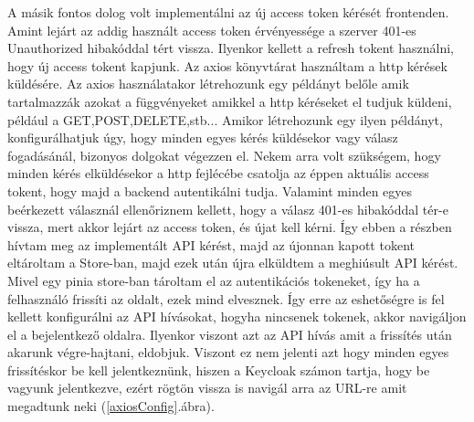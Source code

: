 \documentclass[a4paper,twoside]{article}
\begin{document}
A másik fontos dolog volt implementálni az új access token kérését frontenden. Amint lejárt az addig használt access token érvényessége a szerver 401-es Unauthorized 
hibakóddal tért vissza. Ilyenkor kellett a refresh tokent használni, hogy új access tokent kapjunk. Az axios könyvtárat használtam a http kérések küldésére. Az axios 
használatakor létrehozunk egy példányt belőle amik tartalmazzák azokat a függvényeket amikkel a http kéréseket el tudjuk küldeni, például a GET,POST,DELETE,stb... Amikor létrehozunk egy ilyen példányt, konfigurálhatjuk úgy, hogy minden egyes kérés küldésekor vagy válasz fogadásánál, bizonyos dolgokat végezzen el. Nekem arra volt szükségem, hogy minden kérés elküldésekor a http fejlécébe csatolja az éppen aktuális access tokent, hogy majd a backend autentikálni tudja. Valamint minden egyes beérkezett válasznál ellenőriznem kellett, hogy a válasz 401-es hibakóddal tér-e vissza, mert akkor lejárt az access token, és újat kell kérni. Így ebben a részben hívtam meg az implementált API kérést, majd az újonnan kapott tokent eltároltam a Store-ban, majd ezek után újra elküldtem a meghiúsult API kérést. Mivel egy 
pinia store-ban tároltam el az autentikációs tokeneket, így ha a felhasználó frissíti az oldalt, ezek mind elvesznek. Így erre az eshetőségre is fel kellett konfigurálni az API hívásokat, hogyha nincsenek tokenek, akkor navigáljon el a bejelentkező oldalra. Ilyenkor viszont azt az API hívás amit a frissítés után akarunk végre-hajtani, eldobjuk. Viszont ez nem jelenti azt hogy minden egyes frissítéskor be kell jelentkeznünk, hiszen a Keycloak számon tartja, hogy be vagyunk jelentkezve, ezért rögtön vissza is navigál arra az URL-re amit megadtunk neki (\ref{axiosConfig}.ábra).
\end{document}
